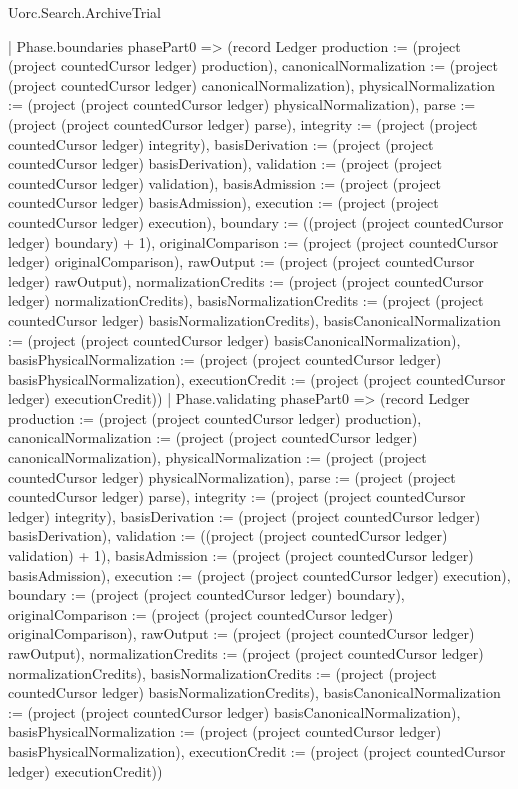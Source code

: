 \begin{lexlean}{Uorc.Search.ArchiveTrial}
\begin{semanticmodule}
{{      | Phase.boundaries phasePart0 => (record Ledger {production := (project (project countedCursor ledger) production), canonicalNormalization := (project (project countedCursor ledger) canonicalNormalization), physicalNormalization := (project (project countedCursor ledger) physicalNormalization), parse := (project (project countedCursor ledger) parse), integrity := (project (project countedCursor ledger) integrity), basisDerivation := (project (project countedCursor ledger) basisDerivation), validation := (project (project countedCursor ledger) validation), basisAdmission := (project (project countedCursor ledger) basisAdmission), execution := (project (project countedCursor ledger) execution), boundary := ((project (project countedCursor ledger) boundary) + 1), originalComparison := (project (project countedCursor ledger) originalComparison), rawOutput := (project (project countedCursor ledger) rawOutput), normalizationCredits := (project (project countedCursor ledger) normalizationCredits), basisNormalizationCredits := (project (project countedCursor ledger) basisNormalizationCredits), basisCanonicalNormalization := (project (project countedCursor ledger) basisCanonicalNormalization), basisPhysicalNormalization := (project (project countedCursor ledger) basisPhysicalNormalization), executionCredit := (project (project countedCursor ledger) executionCredit)})
      | Phase.validating phasePart0 => (record Ledger {production := (project (project countedCursor ledger) production), canonicalNormalization := (project (project countedCursor ledger) canonicalNormalization), physicalNormalization := (project (project countedCursor ledger) physicalNormalization), parse := (project (project countedCursor ledger) parse), integrity := (project (project countedCursor ledger) integrity), basisDerivation := (project (project countedCursor ledger) basisDerivation), validation := ((project (project countedCursor ledger) validation) + 1), basisAdmission := (project (project countedCursor ledger) basisAdmission), execution := (project (project countedCursor ledger) execution), boundary := (project (project countedCursor ledger) boundary), originalComparison := (project (project countedCursor ledger) originalComparison), rawOutput := (project (project countedCursor ledger) rawOutput), normalizationCredits := (project (project countedCursor ledger) normalizationCredits), basisNormalizationCredits := (project (project countedCursor ledger) basisNormalizationCredits), basisCanonicalNormalization := (project (project countedCursor ledger) basisCanonicalNormalization), basisPhysicalNormalization := (project (project countedCursor ledger) basisPhysicalNormalization), executionCredit := (project (project countedCursor ledger) executionCredit)})
}}
\end{semanticmodule}
\end{lexlean}

